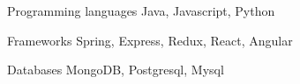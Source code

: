 

\begin{cvskills}

  \cvskill
    {Programming languages} %
    {Java, Javascript, Python} %

  \cvskill
    {Frameworks} %
    {Spring, Express, Redux, React, Angular} %


  \cvskill
    {Databases} %
    {MongoDB, Postgresql, Mysql} %

\end{cvskills}
